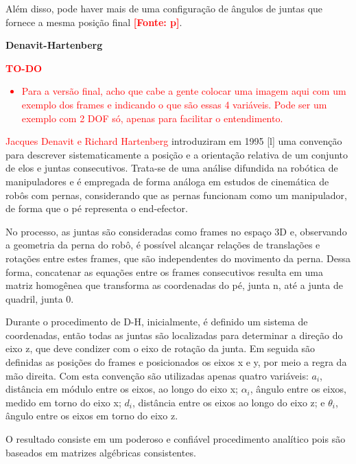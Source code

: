 \documentclass[../main.tex]{subfiles}
\begin{document}
  Além disso, pode haver mais de uma configuração de ângulos de juntas que fornece a mesma posição final \textbf{\textcolor{red}{[Fonte: p]}}.

  \textbf{Denavit-Hartenberg}
  
  \textcolor{red}{\textbf{TO-DO}
  \begin{itemize}
    \item Para a versão final, acho que cabe a gente colocar uma imagem aqui com um exemplo dos frames e indicando o que são essas 4 variáveis. Pode ser um exemplo com 2 DOF só, apenas para facilitar o entendimento.
  \end{itemize}
  }

  \textcolor{red}{Jacques Denavit e Richard Hartenberg} introduziram em 1995 [l] uma convenção para descrever sistematicamente a posição e a orientação relativa de um conjunto de elos e juntas consecutivos. Trata-se de uma análise difundida na robótica de manipuladores e é empregada de forma análoga em estudos de cinemática de robôs com pernas, considerando que as pernas funcionam como um manipulador, de forma que o pé representa o end-efector.

  No processo, as juntas são consideradas como frames no espaço 3D e, observando a geometria da perna do robô, é possível alcançar relações de translações e rotações entre estes frames, que são independentes do movimento da perna. Dessa forma, concatenar as equações entre os frames consecutivos resulta em uma matriz homogênea que transforma as coordenadas do pé, junta n, até a junta de quadril, junta 0. 

  Durante o procedimento de D-H, inicialmente, é definido um sistema de coordenadas, então todas as juntas são localizadas para determinar a direção do eixo z, que deve condizer com o eixo de rotação da junta. Em seguida são definidas as posições do frames e posicionados os eixos x e y, por meio a regra da mão direita. Com esta convenção são utilizadas apenas quatro variáveis: $a_i$, distância em módulo entre os eixos, ao longo do eixo x; $\alpha_i$, ângulo entre os eixos, medido em torno do eixo x; $d_i$, distância entre os eixos ao longo do eixo z; e $\theta_i$, ângulo entre os eixos em torno do eixo z.

  O resultado consiste em um poderoso e confiável procedimento analítico pois são baseados em matrizes algébricas consistentes.
\end{document}
